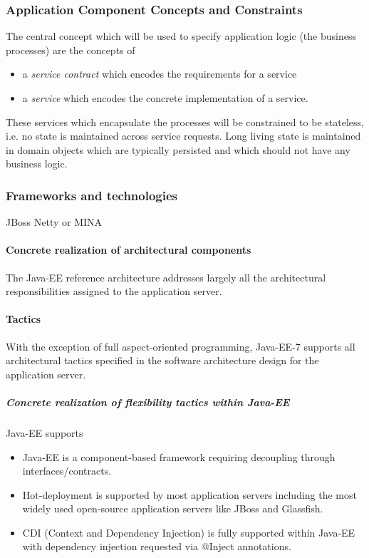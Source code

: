 \documentclass[a4paper,12pt]{report}
\begin{document}
\subsubsection {Application Component Concepts and Constraints}
The central concept which will be used to specify application logic (the business processes) are the
concepts of
	\begin {itemize}
		\item a \textit{service contract} which encodes the requirements for a service
		\item a \textit{service} which encodes the concrete implementation of a service. 
	\end {itemize}
These services which encapsulate the processes will be constrained to be stateless, i.e. no state
is maintained across service requests.
Long living state is maintained in domain objects which are typically persisted and which should
not have any business logic.



\subsubsection {Frameworks and technologies}
JBoss
Netty or MINA


\paragraph {Concrete realization of architectural components}
\hfill \break
The Java-EE reference architecture addresses largely all the architectural responsibilities assigned to the application server.

\paragraph {Tactics}
\hfill \break
With the exception of full aspect-oriented programming, Java-EE-7 supports all architectural tactics specified in the software architecture design for the application server.

\subparagraph {Concrete realization of flexibility tactics  within Java-EE}
\hfill \break
Java-EE supports
	\begin {itemize}
		\item Java-EE is a component-based framework requiring decoupling through interfaces/contracts.
		\item Hot-deployment is supported by most application servers including the most widely used
open-source application servers like JBoss and Glassfish.
		\item CDI (Context and Dependency Injection) is fully supported within Java-EE with dependency
injection requested via @Inject annotations.
	\end {itemize}
\end{document}
